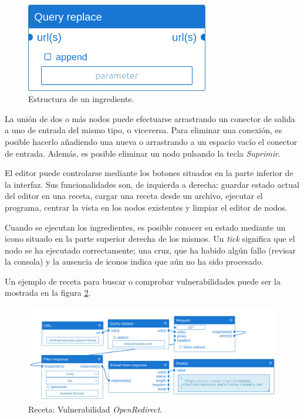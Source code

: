 \begin{figure}[H]
    \centering
    \includegraphics[width=8cm]{img/tables/42_Ingredient.png}
    \caption{Estructura de un ingrediente.}
    \label{fig:ingredientskeleton}
\end{figure}

La unión de dos o más nodos puede efectuarse arrastrando un conector de salida a uno de entrada del mismo tipo, o viceversa. Para eliminar una conexión, es posible hacerlo añadiendo una nueva o arrastrando a un espacio vacío el conector de entrada. Además, es posible eliminar un nodo pulsando la tecla \textit{Suprimir}.\sn

El editor puede controlarse mediante los botones situados en la parte inferior de la interfaz. Sus funcionalidades son, de izquierda a derecha: guardar estado actual del editor en una receta, cargar una receta desde un archivo, ejecutar el programa, centrar la vista en los nodos existentes y limpiar el editor de nodos.\sn

Cuando se ejecutan los ingredientes, es posible conocer su estado mediante un icono situado en la parte superior derecha de los mismos. Un \textit{tick} significa que el nodo se ha ejecutado correctamente; una cruz, que ha habido algún fallo (revisar la consola) y la ausencia de iconos indica que aún no ha sido procesado.\sn

\newpage

Un ejemplo de receta para buscar o comprobar vulnerabilidades puede ser la mostrada en la figura \ref{fig:openredirect}.

\begin{figure}[H]
    \centering
    \includegraphics[width=15cm]{img/tables/43_Recipe-OpenRedirect.png}
    \caption{Receta: Vulnerabilidad \textit{OpenRedirect}.}
    \label{fig:openredirect}
\end{figure}

